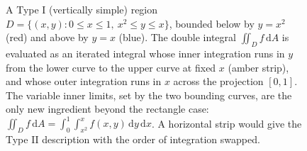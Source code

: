 \begin{figure}[htbp]
\centering
{}
\caption[A Type I region and its inner integration]{A Type I (vertically
simple) region $D = \{(x,y): 0 \le x \le 1,\ x^{2} \le y \le x\}$,
bounded below by $y = x^{2}$ (red) and above by $y = x$ (blue). The
double integral $\iint_{D} f\,\mathrm{d}A$ is evaluated as an iterated
integral whose inner integration runs in $y$ from the lower curve to the
upper curve at fixed $x$ (amber strip), and whose outer integration runs
in $x$ across the projection $[0,1]$. The variable inner limits, set by
the two bounding curves, are the only new ingredient beyond the
rectangle case: $\iint_{D} f\,\mathrm{d}A = \int_{0}^{1}\!\int_{x^{2}}^{x}
f(x,y)\,\mathrm{d}y\,\mathrm{d}x$. A horizontal strip would give the Type
II description with the order of integration swapped.}
\label{fig:vol02:ch06:nonrectangular-region}
\end{figure}
